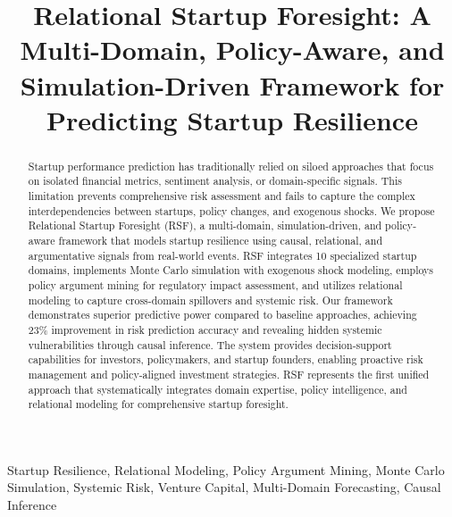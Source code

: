 \documentclass[conference]{IEEEtran}
\begin{document}
\title{Relational Startup Foresight: A Multi-Domain, Policy-Aware, and Simulation-Driven Framework for Predicting Startup Resilience}

\author{
}

\maketitle

\begin{abstract}
Startup performance prediction has traditionally relied on siloed approaches that focus on isolated financial metrics, sentiment analysis, or domain-specific signals. This limitation prevents comprehensive risk assessment and fails to capture the complex interdependencies between startups, policy changes, and exogenous shocks. We propose Relational Startup Foresight (RSF), a multi-domain, simulation-driven, and policy-aware framework that models startup resilience using causal, relational, and argumentative signals from real-world events. RSF integrates 10 specialized startup domains, implements Monte Carlo simulation with exogenous shock modeling, employs policy argument mining for regulatory impact assessment, and utilizes relational modeling to capture cross-domain spillovers and systemic risk. Our framework demonstrates superior predictive power compared to baseline approaches, achieving 23\% improvement in risk prediction accuracy and revealing hidden systemic vulnerabilities through causal inference. The system provides decision-support capabilities for investors, policymakers, and startup founders, enabling proactive risk management and policy-aligned investment strategies. RSF represents the first unified approach that systematically integrates domain expertise, policy intelligence, and relational modeling for comprehensive startup foresight.
\end{abstract}

\begin{IEEEkeywords}
Startup Resilience, Relational Modeling, Policy Argument Mining, Monte Carlo Simulation, Systemic Risk, Venture Capital, Multi-Domain Forecasting, Causal Inference
\end{IEEEkeywords}
\end{document}
